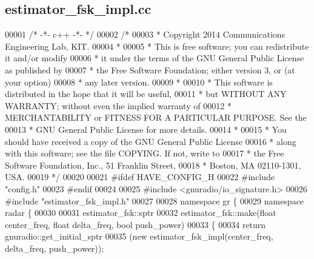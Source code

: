 \subsection{estimator\+\_\+fsk\+\_\+impl.\+cc}
\label{estimator__fsk__impl_8cc_source}

\begin{DoxyCode}
00001 \textcolor{comment}{/* -*- c++ -*- */}
00002 \textcolor{comment}{/* }
00003 \textcolor{comment}{ * Copyright 2014 Communications Engineering Lab, KIT.}
00004 \textcolor{comment}{ * }
00005 \textcolor{comment}{ * This is free software; you can redistribute it and/or modify}
00006 \textcolor{comment}{ * it under the terms of the GNU General Public License as published by}
00007 \textcolor{comment}{ * the Free Software Foundation; either version 3, or (at your option)}
00008 \textcolor{comment}{ * any later version.}
00009 \textcolor{comment}{ * }
00010 \textcolor{comment}{ * This software is distributed in the hope that it will be useful,}
00011 \textcolor{comment}{ * but WITHOUT ANY WARRANTY; without even the implied warranty of}
00012 \textcolor{comment}{ * MERCHANTABILITY or FITNESS FOR A PARTICULAR PURPOSE.  See the}
00013 \textcolor{comment}{ * GNU General Public License for more details.}
00014 \textcolor{comment}{ * }
00015 \textcolor{comment}{ * You should have received a copy of the GNU General Public License}
00016 \textcolor{comment}{ * along with this software; see the file COPYING.  If not, write to}
00017 \textcolor{comment}{ * the Free Software Foundation, Inc., 51 Franklin Street,}
00018 \textcolor{comment}{ * Boston, MA 02110-1301, USA.}
00019 \textcolor{comment}{ */}
00020  
00021 \textcolor{preprocessor}{#ifdef HAVE\_CONFIG\_H}
00022 \textcolor{preprocessor}{#include "config.h"}
00023 \textcolor{preprocessor}{#endif}
00024 
00025 \textcolor{preprocessor}{#include <gnuradio/io\_signature.h>}
00026 \textcolor{preprocessor}{#include "estimator_fsk_impl.h"}
00027 
00028 \textcolor{keyword}{namespace }gr \{
00029   \textcolor{keyword}{namespace }radar \{
00030 
00031     estimator_fsk::sptr
00032     estimator_fsk::make(\textcolor{keywordtype}{float} center_freq, \textcolor{keywordtype}{float} delta\_freq, \textcolor{keywordtype}{bool} push\_power)
00033     \{
00034       \textcolor{keywordflow}{return} gnuradio::get\_initial\_sptr
00035         (\textcolor{keyword}{new} estimator_fsk_impl(center\_freq, delta\_freq, push\_power));

\end{DoxyCode}
